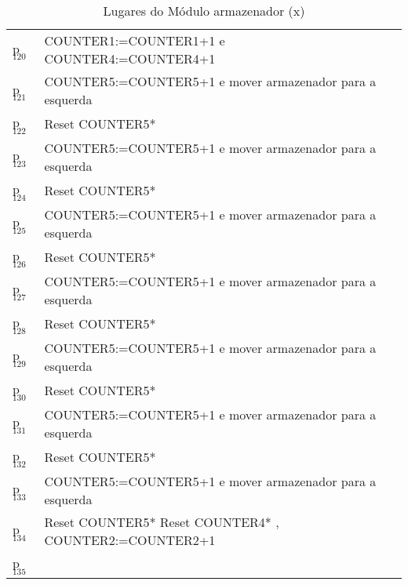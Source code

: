 \begin{table}[htbp]
\caption{Lugares do Módulo armazenador (x)}
\centering
\begin{tabular}{ll}
p\(_{\text{120}}\) & COUNTER1:=COUNTER1+1 e COUNTER4:=COUNTER4+1\\
p\(_{\text{121}}\) & COUNTER5:=COUNTER5+1 e mover armazenador para a esquerda\\
p\(_{\text{122}}\) & Reset COUNTER5*\\
p\(_{\text{123}}\) & COUNTER5:=COUNTER5+1 e mover armazenador para a esquerda\\
p\(_{\text{124}}\) & Reset COUNTER5*\\
p\(_{\text{125}}\) & COUNTER5:=COUNTER5+1 e mover armazenador para a esquerda\\
p\(_{\text{126}}\) & Reset COUNTER5*\\
p\(_{\text{127}}\) & COUNTER5:=COUNTER5+1 e mover armazenador para a esquerda\\
p\(_{\text{128}}\) & Reset COUNTER5*\\
p\(_{\text{129}}\) & COUNTER5:=COUNTER5+1 e mover armazenador para a esquerda\\
p\(_{\text{130}}\) & Reset COUNTER5*\\
p\(_{\text{131}}\) & COUNTER5:=COUNTER5+1 e mover armazenador para a esquerda\\
p\(_{\text{132}}\) & Reset COUNTER5*\\
p\(_{\text{133}}\) & COUNTER5:=COUNTER5+1 e mover armazenador para a esquerda\\
p\(_{\text{134}}\) & Reset COUNTER5* Reset COUNTER4* , COUNTER2:=COUNTER2+1\\
p\(_{\text{135}}\) & \\
\end{tabular}
\end{table}

